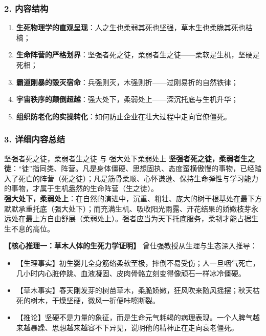 \subsubsection{2. 内容结构}
\begin{enumerate}
    \item \textbf{生死物理学的直观呈现}：人之生也柔弱其死也坚强，草木生也柔脆其死也枯槁；
    \item \textbf{生命阵营的严格划界}：坚强者死之徒，柔弱者生之徒——柔软是生机，坚硬是死相；
    \item \textbf{霸道刚暴的毁灭宿命}：兵强则灭，木强则折——过刚易折的自然铁律；
    \item \textbf{宇宙秩序的颠倒超越}：强大处下，柔弱处上——深沉托底与生机升华；
    \item \textbf{组织防老化的实操转化}：如何防止企业在壮大过程中走向官僚僵死。
\end{enumerate}

\subsubsection{3. 详细内容总结}

\begin{ConceptBox}{坚强者死之徒，柔弱者生之徒 与 强大处下柔弱处上}
\textbf{坚强者死之徒，柔弱者生之徒}：“徒”指同类、阵营。凡是身体僵硬、思想固执、态度蛮横傲慢的事物，已经踏入了死亡的阵营（死之徒）；凡是筋骨柔顺、心怀谦逊、保持生命弹性与学习能力的事物，才属于生机盎然的生命阵营（生之徒）。\\
\textbf{强大处下，柔弱处上}：在自然的演进中，沉重、粗壮、庞大的树干根基处在最下方默默承重托底（强大处下）；而充满生机、吸收阳光雨露、开花结果的娇嫩枝芽永远处在最上方自由舒展（柔弱处上）。强者应当为天下托底服务，柔韧才能占据生生不息的高位。
\end{ConceptBox}

\noindent\textbf{【核心推理一：草木人体的生死力学证明】}
曾仕强教授从生理与生态深入推导：
\begin{itemize}
    \item 【生理事实】初生婴儿全身筋络柔软至极，摔倒不易受伤；人一旦咽气死亡，几小时内心脏停跳、血液凝固、皮肉骨骼立刻变得像顽石一样冰冷僵硬。
    \item 【草木事实】春天刚发芽的树苗草木，柔脆娇嫩，狂风吹来随风摇摆；秋天枯死的树木，干燥坚硬，微风一折便咔嚓断裂。
    \item 【推论】坚硬不是力量的象征，而是生命元气耗竭的病理表现。一个人脾气越来越暴躁、思想越来越容不下异见，说明他的精神正在走向衰老僵死。
\end{itemize}

